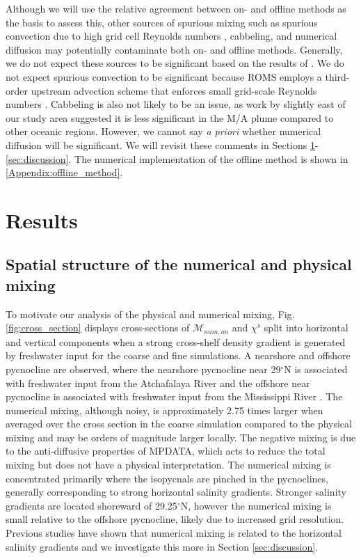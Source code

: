 Although we will use the relative agreement between on- and offline methods as the basis to assess this, other sources of spurious mixing such as spurious convection due to high grid cell Reynolds numbers \citep{ilicak2016quantifying, Ilicak_2012}, cabbeling, and numerical diffusion may potentially contaminate both on- and offline methods. Generally, we do not expect these sources to be significant based on the results of \citet{Wang_2021}. We do not expect spurious convection to be significant because ROMS employs a third-order upstream advection scheme that enforces small grid-scale Reynolds numbers \citep{Ilicak_2012,shchepetkin2005regional}. Cabbeling is also not likely to be an issue, as work by \citet{barkan2017submesoscalepart2} slightly east of our study area suggested it is less significant in the M/A plume compared to other oceanic regions. However, we cannot say \textit{a priori} whether numerical diffusion will be significant. We will revisit these comments in Sections \ref{sec:results}-\ref{sec:discussion}. The numerical implementation of the offline method is shown in \ref{Appendix:offline_method}.

\section{Results} \label{sec:results}

\subsection{Spatial structure of the numerical and physical mixing}

To motivate our analysis of the physical and numerical mixing, Fig. \ref{fig:cross_section} displays cross-sections of $\mathcal{M}_{num, on}$ and $\chi^s$ split into horizontal and vertical components when a strong cross-shelf density gradient is generated by freshwater input for the coarse and fine simulations. A nearshore and offshore pycnocline are observed, where the nearshore pycnocline near 29$^\circ$N is associated with freshwater input from the Atchafalaya River and the offshore near pycnocline is associated with freshwater input from the Mississippi River \citep{Kobashi_2020}. The numerical mixing, although noisy, is approximately 2.75 times larger when averaged over the cross section in the coarse simulation compared to the physical mixing and may be orders of magnitude larger locally. The negative mixing is due to the anti-diffusive properties of MPDATA, which acts to reduce the total mixing but does not have a physical interpretation. The numerical mixing is concentrated primarily where the isopycnals are pinched in the pycnoclines, generally corresponding to strong horizontal salinity gradients. Stronger salinity gradients are located shoreward of 29.25$^{\circ}$N, however the numerical mixing is small relative to the offshore pycnocline, likely due to increased grid resolution. Previous studies have shown that numerical mixing is related to the horizontal salinity gradients \citep{hofmeister2011realistic, Kalra_2019, Klingbeil_2014,Wang_2021} and we investigate this more in Section \ref{sec:discussion}.

